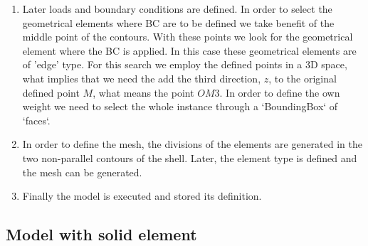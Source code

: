 \documentclass[english,a4paper,12pt]{article}
\begin{document}
\begin{enumerate}
\item
Later loads and boundary conditions are defined. In order to select the geometrical elements where BC are to be defined we take benefit of the middle point of the contours. With these points we look for the geometrical element where the BC is applied. In this case these geometrical elements are of 'edge' type. For this search we employ the defined points in a 3D space, what implies that we need the add the third direction, $z$, to the original defined point $M$, what means the point $OM3$. In order to define the own weight we need to select the whole instance through a `BoundingBox` of `faces`.
\item
In order to define the mesh, the divisions of the elements are generated in the two non-parallel contours of the shell. Later, the element type is defined and the mesh can be generated.
\item
Finally the model is executed and stored its definition.
\end{enumerate}

\subsection{Model with solid element}

\end{document}
